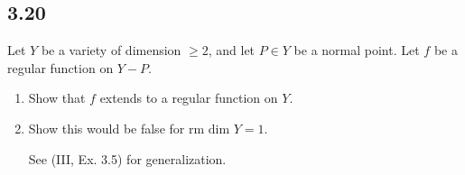 \subsection*{3.20}

Let $Y$ be a variety of dimension $\geq 2$, and let $P \in Y$ be a normal point.  Let $f$ be a
regular function on $Y - P$.
\begin{enumerate}
    \item Show that $f$ extends to a regular function on $Y$.
    \item Show this would be false for $\mbox{rm dim }Y = 1$.

    See (III, Ex. 3.5) for generalization.
\end{enumerate}

